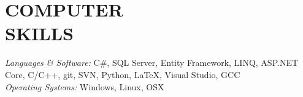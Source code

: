 
\section{COMPUTER \\ SKILLS} {\sl Languages \& Software:} C\#, SQL Server,
	Entity Framework, LINQ, ASP.NET Core, C/C++, git, SVN, Python, \LaTeX,
	Visual Studio, GCC\\
	{\sl Operating Systems:} Windows, Linux, OSX
